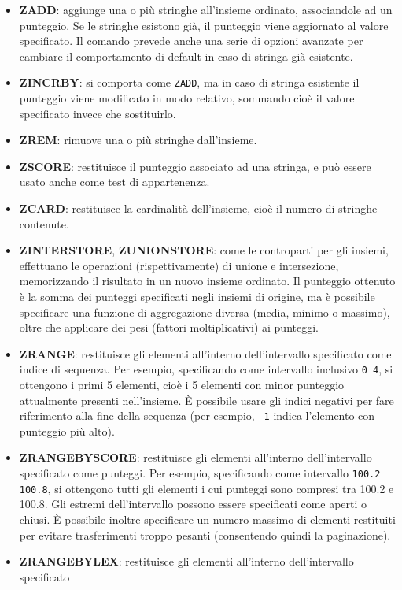 \begin{itemize}
	\medskip
	\item \textbf{ZADD}: aggiunge una o più stringhe all'insieme ordinato, associandole ad un
	punteggio. Se le stringhe esistono già, il punteggio viene aggiornato al valore specificato. Il
	comando prevede anche una serie di opzioni avanzate per cambiare il comportamento di default in
	caso di stringa già esistente.
	\item \textbf{ZINCRBY}: si comporta come \verb|ZADD|, ma in caso di stringa esistente il
	punteggio viene modificato in modo relativo, sommando cioè il valore specificato invece che
	sostituirlo.
	\item \textbf{ZREM}: rimuove una o più stringhe dall'insieme.
	\item \textbf{ZSCORE}: restituisce il punteggio associato ad una stringa, e può essere usato
	anche come test di appartenenza.
	\item \textbf{ZCARD}: restituisce la cardinalità dell'insieme, cioè il numero di stringhe
	contenute.
	\item \textbf{ZINTERSTORE}, \textbf{ZUNIONSTORE}: come le controparti per gli insiemi,
	effettuano le operazioni (rispettivamente) di unione e intersezione, memorizzando il risultato
	in un nuovo insieme ordinato. Il punteggio ottenuto è la somma dei punteggi specificati negli
	insiemi di origine, ma è possibile specificare una funzione di aggregazione diversa (media,
	minimo o massimo), oltre che applicare dei pesi (fattori moltiplicativi) ai punteggi.
	\item \textbf{ZRANGE}: restituisce gli elementi all'interno dell'intervallo specificato come
	indice di sequenza. Per esempio, specificando come intervallo inclusivo \verb|0 4|, si
	ottengono i primi 5 elementi, cioè i 5 elementi con minor punteggio attualmente presenti
	nell'insieme. È possibile usare gli indici negativi per fare riferimento alla fine della
	sequenza (per esempio, \verb|-1| indica l'elemento con punteggio più alto).
	\item \textbf{ZRANGEBYSCORE}: restituisce gli elementi all'interno dell'intervallo specificato
	come punteggi. Per esempio, specificando come intervallo \verb|100.2 100.8|, si ottengono tutti
	gli elementi i cui punteggi sono compresi tra 100.2 e 100.8. Gli estremi dell'intervallo
	possono essere specificati come aperti o chiusi. È possibile inoltre specificare un numero
	massimo di elementi restituiti per evitare trasferimenti troppo pesanti (consentendo quindi la
	paginazione).
	\item \textbf{ZRANGEBYLEX}: restituisce gli elementi all'interno dell'intervallo specificato

\end{itemize}

